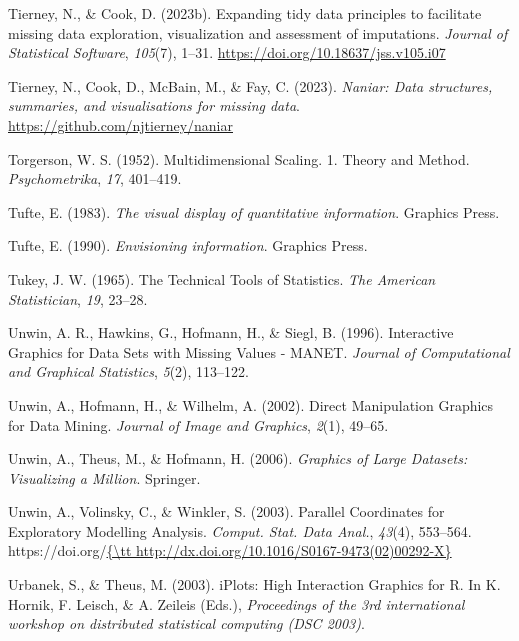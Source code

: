 \documentclass[
  letterpaper,
]{krantz}
\newlength{\cslhangindent}
\newenvironment{CSLReferences}[2] %
 {\begin{list}{}{%
  \setlength{\itemindent}{0pt}
  \setlength{\leftmargin}{0pt}
  \setlength{\parsep}{0pt}
  \ifodd #1
   \setlength{\leftmargin}{\cslhangindent}
   \setlength{\itemindent}{-1\cslhangindent}
  \fi
  \setlength{\itemsep}{#2\baselineskip}}}
 {\end{list}}
\begin{document}
\begin{CSLReferences}{1}{0}
Tierney, N., \& Cook, D. (2023b). Expanding tidy data principles to
facilitate missing data exploration, visualization and assessment of
imputations. \emph{Journal of Statistical Software}, \emph{105}(7),
1--31. \url{https://doi.org/10.18637/jss.v105.i07}

Tierney, N., Cook, D., McBain, M., \& Fay, C. (2023). \emph{Naniar: Data
structures, summaries, and visualisations for missing data}.
\url{https://github.com/njtierney/naniar}

Torgerson, W. S. (1952). Multidimensional {S}caling. 1. {T}heory and
{M}ethod. \emph{Psychometrika}, \emph{17}, 401--419.

Tufte, E. (1983). \emph{The visual display of quantitative information}.
Graphics Press.

Tufte, E. (1990). \emph{Envisioning information}. Graphics Press.

Tukey, J. W. (1965). The {T}echnical {T}ools of {S}tatistics. \emph{The
American Statistician}, \emph{19}, 23--28.

Unwin, A. R., Hawkins, G., Hofmann, H., \& Siegl, B. (1996).
{I}nteractive {G}raphics for {D}ata {S}ets with {M}issing {V}alues -
{MANET}. \emph{Journal of Computational and Graphical Statistics},
\emph{5}(2), 113--122.

Unwin, A., Hofmann, H., \& Wilhelm, A. (2002). Direct {M}anipulation
{G}raphics for {D}ata {M}ining. \emph{Journal of Image and Graphics},
\emph{2}(1), 49--65.

Unwin, A., Theus, M., \& Hofmann, H. (2006). \emph{Graphics of {L}arge
{D}atasets: {V}isualizing a {M}illion}. Springer.

Unwin, A., Volinsky, C., \& Winkler, S. (2003). Parallel {C}oordinates
for {E}xploratory {M}odelling {A}nalysis. \emph{Comput. Stat. Data
Anal.}, \emph{43}(4), 553--564.
https://doi.org/\href{\%7B/tt\%20http://dx.doi.org/10.1016/S0167-9473(02)00292-X\%7D}{\{\textbackslash tt
http://dx.doi.org/10.1016/S0167-9473(02)00292-X\}}

Urbanek, S., \& Theus, M. (2003). {iPlots}: {H}igh {I}nteraction
{G}raphics for {R}. In K. Hornik, F. Leisch, \& A. Zeileis (Eds.),
\emph{Proceedings of the 3rd international workshop on distributed
statistical computing (DSC 2003)}.


\end{CSLReferences}
\end{document}
